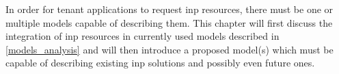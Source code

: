 In order for tenant applications to request \gls{inp} resources, there must be one or multiple models capable of describing them.
This chapter will first discuss the integration of \gls{inp} resources in currently used models described in \autoref{models_analysis} and will then introduce a proposed model(s) which must be capable of describing existing \gls{inp} solutions and possibly even future ones.